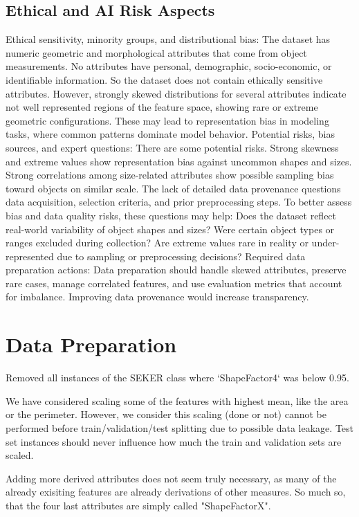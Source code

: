 \documentclass[sigconf]{acmart}
\begin{document}
\subsection{Ethical and AI Risk Aspects}
Ethical sensitivity, minority groups, and distributional bias: The dataset has numeric geometric and morphological attributes that come from object measurements.  No attributes have personal, demographic, socio-economic, or identifiable information. So the dataset does not contain ethically sensitive attributes.  However, strongly skewed distributions for several attributes indicate not well represented regions of the feature space, showing rare or extreme geometric configurations. These may lead to representation bias in modeling tasks, where common patterns dominate model behavior.  Potential risks, bias sources, and expert questions: There are some potential risks. Strong skewness and extreme values show representation bias against uncommon shapes and sizes. Strong correlations among size-related attributes show possible sampling bias toward objects on similar scale. The lack of detailed data provenance questions data acquisition, selection criteria, and prior preprocessing steps. To better assess bias and data quality risks, these questions may help: Does the dataset reflect real-world variability of object shapes and sizes? Were certain object types or ranges excluded during collection? Are extreme values rare in reality or under-represented due to sampling or preprocessing decisions?  Required data preparation actions: Data preparation should handle skewed attributes, preserve rare cases, manage correlated features, and use evaluation metrics that account for imbalance. Improving data provenance would increase transparency.

\section{Data Preparation}
Removed all instances of the SEKER class where `ShapeFactor4` was below 0.95.

We have considered scaling some of the features with highest mean, like the area or the perimeter. However, we consider this scaling (done or not) cannot be performed before train/validation/test splitting due to possible data leakage. Test set instances should never influence how much the train and validation sets are scaled.

Adding more derived attributes does not seem truly necessary, as many of the already exisiting features are already derivations of other measures. So much so, that the four last attributes are simply called "ShapeFactorX".
\end{document}
